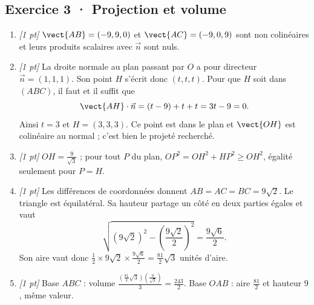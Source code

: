 \subsection*{Exercice 3 · Projection et volume}\begin{enumerate}

\item \textit{[1 pt]} $\vect{AB}=(-9,9,0)$ et $\vect{AC}=(-9,0,9)$ sont non colinéaires et leurs produits scalaires avec $\vec n$ sont nuls.

\item \textit{[1 pt]} La droite normale au plan passant par $O$ a pour directeur $\vec n=(1,1,1)$. Son point $H$ s'écrit donc $(t,t,t)$. Pour que $H$ soit dans $(ABC)$, il faut et il suffit que
\[\vect{AH}\cdot\vec n=(t-9)+t+t=3t-9=0.\]
Ainsi $t=3$ et $H=(3,3,3)$. Ce point est dans le plan et $\vect{OH}$ est colinéaire au normal ; c'est bien le projeté recherché.

\item \textit{[1 pt]} $OH=\frac{9}{\sqrt{3}}$ ; pour tout $P$ du plan, $OP^2=OH^2+HP^2\ge OH^2$, égalité seulement pour $P=H$.

\item \textit{[1 pt]} Les différences de coordonnées donnent $AB=AC=BC=9\sqrt2$. Le triangle est équilatéral. Sa hauteur partage un côté en deux parties égales et vaut
\[\sqrt{(9\sqrt2)^2-(\frac{9\sqrt{2}}{2})^2}=\frac{9\sqrt6}{2}.\]
Son aire vaut donc $\frac12\times 9\sqrt2\times\frac{9\sqrt6}{2}=\frac{81}{2}\sqrt3$ unités d'aire.

\item \textit{[1 pt]} Base $ABC$ : volume $\frac{(\frac{81}{2}\sqrt3)(\frac{9}{\sqrt{3}})}{3}=\frac{243}{2}$. Base $OAB$ : aire $\frac{81}{2}$ et hauteur $9$, même valeur.

\end{enumerate}

